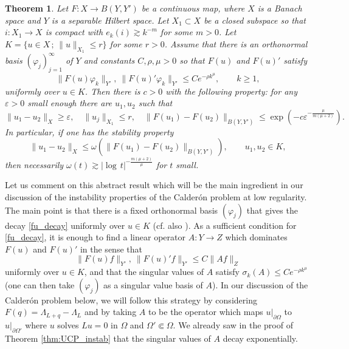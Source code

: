 \documentclass[12pt,twoside]{amsart}
\numberwithin{equation}{section}
\renewcommand{\leq}{\leqslant}
\renewcommand{\geq}{\geqslant}
\newtheorem{theorem}{Theorem}[section]
\newcommand {\p} {\partial}
\newcommand{\abs}[1]{\lvert #1 \rvert}          %
\newcommand{\norm}[1]{\lVert #1 \rVert}         %
\newcommand{\eps}{\varepsilon}
\begin{document}
\begin{theorem} \label{thm_lowreg_calderon_abstract}
Let $F: X \to B(Y,Y')$ be a continuous map, where $X$ is a Banach space and $Y$ is a separable Hilbert space. Let $X_1 \subset X$ be a closed subspace so that $i: X_1 \to X$ is compact with $e_k(i) \gtrsim k^{-m}$ for some $m > 0$. Let $K = \{ u \in X \,;\, \norm{u}_{X_1} \leq r \}$ for some $r > 0$. Assume that there is an orthonormal basis $(\varphi_j)_{j=1}^{\infty}$ of $Y$ and constants $C, \rho, \mu > 0$ so that $F(u)$ and $F(u)'$ satisfy 
\begin{equation} \label{fu_decay}
\norm{F(u) \varphi_k}_{Y'}, \ \norm{F(u)' \varphi_k}_{Y'} \leq C e^{-\rho k^{\mu}}, \qquad k \geq 1,
\end{equation}
uniformly over $u \in K$. Then there is $c > 0$ with the following property: for any $\eps > 0$ small enough there are $u_1, u_2$ such that
\begin{equation} \label{instab_restatement1}
\|u_1-u_2\|_{X} \geq \eps, \quad \|u_j\|_{X_1} \leq r, \quad \|F(u_1)-F(u_2)\|_{B(Y,Y')} \leq \exp(-c \eps^{-\frac{\mu}{m(\mu+2)}}).
\end{equation}
In particular, if one has the stability property 
\[
\norm{u_1-u_2}_X \leq \omega(\norm{F(u_1)- F(u_2)}_{B(Y,Y')}), \qquad u_1, u_2 \in K,
\]
then necessarily $\omega(t) \gtrsim \abs{\log\,t}^{-\frac{m(\mu+2)}{\mu}}$ for $t$ small.
\end{theorem}

Let us comment on this abstract result which will be the main ingredient in our discussion of the instability properties of the Calder\'on problem at low regularity. The main point is that there is a fixed orthonormal basis $(\varphi_j)$ that gives the decay \eqref{fu_decay} uniformly over $u \in K$ (cf. also \cite{DiCristoRondi}). As a sufficient condition for \eqref{fu_decay}, it is enough to find a linear operator $A: Y \to Z$ which dominates $F(u)$ and $F(u)'$ in the sense that 
\[
\norm{F(u)f}_{Y'}, \ \norm{F(u)'f}_{Y'} \leq C \norm{Af}_Z
\]
uniformly over $u \in K$, and that the singular values of $A$ satisfy $\sigma_k(A) \leq C e^{-\rho k^{\mu}}$ (one can then take $(\varphi_j)$ as a singular value basis of $A$). In our discussion of the Calder\'on problem below, we will follow this strategy by considering $F(q)= \Lambda_{L+q} - \Lambda_L$ and by taking $A$ to be the operator which maps $u|_{\p \Omega}$ to $u|_{\p \Omega'}$ where $u$ solves $L u = 0$ in $\Omega$ and $\Omega' \Subset  \Omega$. We already saw in the proof of Theorem \ref{thm:UCP_instab} that the singular values of $A$ decay exponentially.
\end{document}
